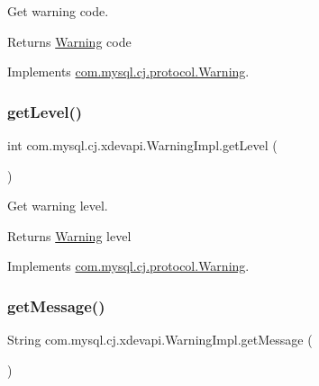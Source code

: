 Get warning code.

\begin{DoxyReturn}{Returns}
\mbox{\hyperlink{interfacecom_1_1mysql_1_1cj_1_1xdevapi_1_1_warning}{Warning}} code 
\end{DoxyReturn}


Implements \mbox{\hyperlink{interfacecom_1_1mysql_1_1cj_1_1protocol_1_1_warning_a2cce849fce9ca14b8e1d673a24b4d1d2}{com.\+mysql.\+cj.\+protocol.\+Warning}}.

\mbox{\label{classcom_1_1mysql_1_1cj_1_1xdevapi_1_1_warning_impl_abc0fcf3e60763b3d3ce1b7126be22f61}} 
\subsubsection{\texorpdfstring{get\+Level()}{getLevel()}}
{\footnotesize\ttfamily int com.\+mysql.\+cj.\+xdevapi.\+Warning\+Impl.\+get\+Level (\begin{DoxyParamCaption}{ }\end{DoxyParamCaption})}

Get warning level.

\begin{DoxyReturn}{Returns}
\mbox{\hyperlink{interfacecom_1_1mysql_1_1cj_1_1xdevapi_1_1_warning}{Warning}} level 
\end{DoxyReturn}


Implements \mbox{\hyperlink{interfacecom_1_1mysql_1_1cj_1_1protocol_1_1_warning_a37396ddf66dbd9e7cd386825e0a47966}{com.\+mysql.\+cj.\+protocol.\+Warning}}.

\mbox{\label{classcom_1_1mysql_1_1cj_1_1xdevapi_1_1_warning_impl_afeeda25bc13726f35b4198262c46f605}} 
\subsubsection{\texorpdfstring{get\+Message()}{getMessage()}}
{\footnotesize\ttfamily String com.\+mysql.\+cj.\+xdevapi.\+Warning\+Impl.\+get\+Message (\begin{DoxyParamCaption}{ }\end{DoxyParamCaption})}

